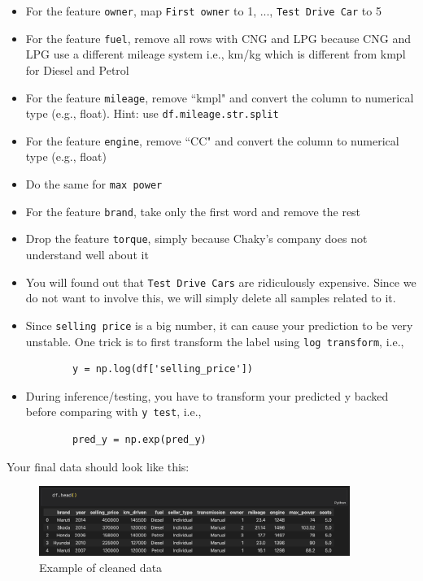 \documentclass{homework}
\begin{document}
\begin{itemize}
    \item For the feature \texttt{owner}, map \texttt{First owner} to 1, ..., \texttt{Test Drive Car} to 5
    \item For the feature \texttt{fuel}, remove all rows with CNG and LPG because CNG and LPG use a different mileage system i.e., km/kg which is different from kmpl for Diesel and Petrol
    \item For the feature \texttt{mileage}, remove ``kmpl" and convert the column to numerical type (e.g., float).  Hint:  use \texttt{df.mileage.str.split}
    \item For the feature \texttt{engine}, remove ``CC" and convert the column to numerical type (e.g., float)
    \item Do the same for \texttt{max power}
    \item For the feature \texttt{brand}, take only the first word and remove the rest
    \item Drop the feature \texttt{torque}, simply because Chaky's company does not understand well about it
    \item You will found out that \texttt{Test Drive Cars} are ridiculously expensive.  Since we do not want to involve this, we will simply delete all samples related to it.
    \item Since \texttt{selling price} is a big number, it can cause your prediction to be very unstable.  One trick is to first transform the label using \texttt{log transform}, i.e., 
    
    \begin{lstlisting}
        y = np.log(df['selling_price'])
    \end{lstlisting}

    \item During inference/testing, you have to transform your predicted y backed before comparing with \texttt{y test}, i.e., 

    \begin{lstlisting}
        pred_y = np.exp(pred_y)
    \end{lstlisting}
    
\end{itemize}

Your final data should look like this:

\begin{figure}[h]
    \centering
    \includegraphics[width=0.9\textwidth]{media/fig1.png}
    \caption{Example of cleaned data}
\end{figure}
\end{document}
